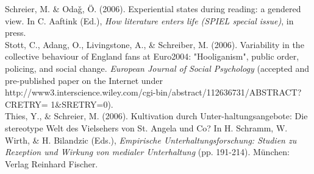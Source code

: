 Schreier, M. \& Oda\v{g}, \"{O}. (2006). Experiential states during reading: a gendered view. In C. Aaftink (Ed.), \textit{How literature enters life (SPIEL special issue)}, in press.\\

Stott, C., Adang, O., Livingstone, A., \& Schreiber, M. (2006). Variability in the collective behaviour of England fans at Euro2004: "Hooliganism", public order, policing, and social change. \textit{European Journal of Social Psychology }(accepted and pre-published paper on the Internet under http://www3.interscience.wiley.com/cgi-bin/abstract/112636731/ABSTRACT? CRETRY= 1\&SRETRY=0).\\

Thies, Y., \& Schreier, M. (2006). Kultivation durch Unter-haltungsangebote: Die stereotype Welt des Vielsehers von St. Angela und Co? In H. Schramm, W. Wirth, \& H. Bilandzic (Eds.), \textit{Empirische Unterhaltungsforschung: Studien zu Rezeption und Wirkung von medialer Unterhaltung }(pp. 191-214). M\"{u}nchen: Verlag Reinhard Fischer.\\
